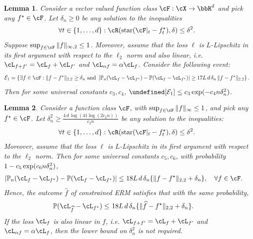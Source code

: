 \documentclass[11pt]{article} %
\theoremstyle{theorem}  %
\newtheorem{lemma}{Lemma}
\theoremstyle{plain}
\DeclarePairedDelimiter{\prn}{(}{)}
\let\Pr\undefined
\DeclareMathOperator{\Pr}{Pr}
\newcommand{\wh}[1]{\widehat{#1}}
\newcommand{\R}{\bbR}
\newcommand{\Pn}{\ensuremath{\mathbb{P}}}
\newcommand{\sh}{\ensuremath{\mathrm{star}}}
\newcommand{\rbar}{|}
\renewcommand{\hat}[1]{\wh{#1}}
\begin{document}
\begin{lemma}\label{lem:tighter_peeling} Consider a vector valued function class $\cF: \cX\rightarrow \R^d$ and pick any $f^{\star}\in \cF$. Let $\delta_n\geq 0$  be any solution to the inequalities
\begin{equation}
\forall t\in \{1,\ldots, d\}: \cR(\sh(\cF\rbar_t - f_t^{\star}),\delta) \leq \delta^2.
\end{equation}
Suppose $\sup_{f\in \cF} \|f\|_{\infty,2}\leq 1$. Moreover, assume that the loss $\ell$ is $L$-Lipschitz in its first argument with respect to the $\ell_2$ norm and also linear, i.e. $\cL_{f + f'}=\cL_{f} + \cL_{f'}$ and $\cL_{\alpha f}=\alpha\cL_{f}$. Consider the following event:
\begin{equation}
{\cal E}_1 = \left\{\exists f \in \cF: \|f - f^{\star} \|_{2,2} \geq
  \delta_n \text{ and } \left| \Pn_n (\cL_{f} - \cL_{f^{\star}}) - \Pn
    (\cL_{f} - \cL_{f^{\star}}) \right| \geq 17 L\,d\, \delta_n\, \|f -
  f^{\star}\|_{2,2}\right\}.
\end{equation}
Then for some universal constants $c_3, c_4$, $\Pr[{\cal E}_1] \leq c_3 \exp\prn{-c_4 n \delta_n^2}$.
\end{lemma}

\begin{lemma}\label{lem:lipschitz_wainwright}
Consider a function class $\cF$, with $\sup_{f\in \cF} \|f\|_{\infty}\leq 1$, and pick any $f^{\star}\in \cF$. Let $\delta_n^2\geq \frac{4\,d\,\log(41\log(2c_2 n))}{c_2 n}$ be any solution to the inequalities:
\begin{equation}
\forall t\in \{1,\ldots, d\}: \cR(\sh(\cF\rbar_t - f_t^{\star}),\delta) \leq \delta^2.
\end{equation}
Moreover, assume that the loss $\ell$ is $L$-Lipschitz in its first argument with respect to the $\ell_2$ norm. Then for some universal constants $c_5, c_6$, with probability $1-c_5 \exp\prn{c_6 n \delta_n^2}$,
\begin{align}\label{eqn:lipschitz_loss_gen}
\left| \Pn_n (\cL_{f} - \cL_{f^{\star}}) - \Pn (\cL_{f} - \cL_{f^{\star}}) \right| \leq~& 18 L\, d\, \delta_n \{ \|f - f^{\star}\|_{2,2} + \delta_n\},\quad \forall f \in \cF.
\end{align}
Hence, the outcome $\hat{f}$ of constrained ERM satisfies that with the same probability,
\begin{align}
\Pn (\cL_{\hat{f}} - \cL_{f^{\star}}) \leq~& 18 L\,d\, \delta_n \{ \|\hat{f} - f^{\star}\|_{2,2} + \delta_n\}.
\end{align}
If the loss $\cL_{f}$ is also linear in $f$, i.e. $\cL_{f + f'}=\cL_{f} + \cL_{f'}$ and $\cL_{\alpha f}=\alpha\cL_{f}$, then the lower bound on $\delta_n^2$ is not required.
\end{lemma}
\end{document}
